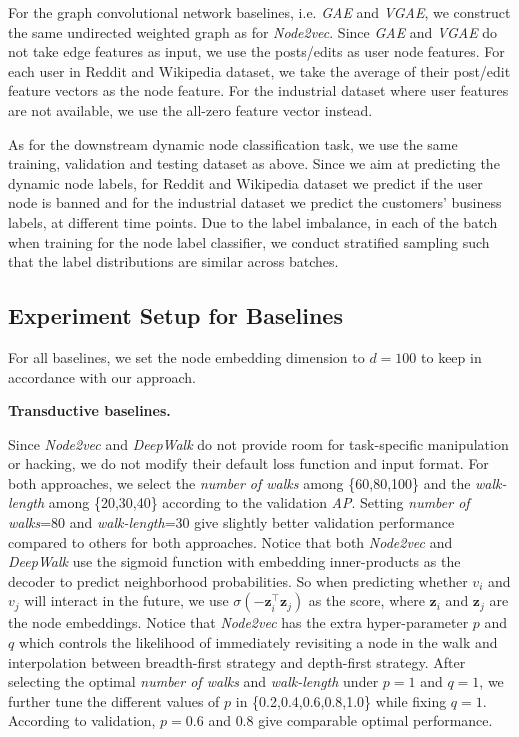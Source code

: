 \documentclass{article} %
\newcommand{\zbf}{\mathbf{z}}
\begin{document}
For the graph convolutional network baselines, i.e. \textsl{GAE} and \textsl{VGAE}, we construct the same undirected weighted graph as for \textsl{Node2vec}. Since \textsl{GAE} and \textsl{VGAE} do not take edge features as input, we use the posts/edits as user node features. For each user in Reddit and Wikipedia dataset, we take the average of their post/edit feature vectors as the node feature. For the industrial dataset where user features are not available, we use the all-zero feature vector instead.

As for the downstream dynamic node classification task, we use the same training, validation and testing dataset as above. Since we aim at predicting the dynamic node labels, for Reddit and Wikipedia dataset we predict if the user node is banned and for the industrial dataset we predict the customers' business labels, at different time points. Due to the label imbalance, in each of the batch when training for the node label classifier, we conduct stratified sampling such that the label distributions are similar across batches.


\subsection{Experiment Setup for Baselines}
For all baselines, we set the node embedding dimension to $d=100$ to keep in accordance with our approach.

\textbf{Transductive baselines.}

Since \textsl{Node2vec} and \textsl{DeepWalk} do not provide room for task-specific manipulation or hacking, we do not modify their default loss function and input format. For both approaches, we select the \emph{number of walks} among \{60,80,100\} and the \textsl{walk-length} among \{20,30,40\} according to the validation \emph{AP}. Setting \emph{number of walks}=80 and \textsl{walk-length}=30 give slightly better validation performance compared to others for both approaches. Notice that both \textsl{Node2vec} and \textsl{DeepWalk} use the sigmoid function with embedding inner-products as the decoder to predict neighborhood probabilities. So when predicting whether $v_i$ and $v_j$ will interact in the future, we use $\sigma(-\zbf_i ^{\intercal}\zbf_j)$ as the score, where $\zbf_i$ and $\zbf_j$ are the node embeddings. Notice that \textsl{Node2vec} has the extra hyper-parameter $p$ and $q$ which controls the likelihood of immediately revisiting a node in the walk and interpolation between breadth-first strategy and depth-first strategy. After selecting the optimal \emph{number of walks} and \textsl{walk-length} under $p=1$ and $q=1$, we further tune the different values of $p$ in \{0.2,0.4,0.6,0.8,1.0\} while fixing $q=1$. According to validation, $p=0.6$ and $0.8$ give comparable optimal performance. 
\end{document}
